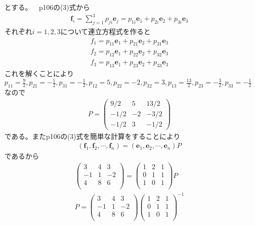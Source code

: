 \documentclass[dvipdfmx,uplatex,11pt]{jsarticle}
\begin{document}
とする。~~p106の(3)式から
\begin{eqnarray*}
\bm{f}_i=\sum^{3}_{j=1}p_{ji}\bm{e}_{j}=p_{1i}\bm{e}_1+p_{2i}\bm{e}_2+p_{3i}\bm{e}_3
\end{eqnarray*}
それぞれ$i=1,2,3$について連立方程式を作ると
\begin{eqnarray*}
f_1=p_{11}\bm{e}_1+p_{21}\bm{e}_2+p_{31}\bm{e}_3 \\
f_2=p_{12}\bm{e}_1+p_{22}\bm{e}_2+p_{32}\bm{e}_3 \\
f_3=p_{13}\bm{e}_1+p_{23}\bm{e}_2+p_{33}\bm{e}_3
\end{eqnarray*}
これを解くことにより$p_{11}=\frac{9}{2},p_{21}=-\frac{1}{2},p_{31}=-\frac{1}{2},p_{12}=5,p_{22}=-2,p_{32}=3,p_{13}=\frac{13}{2},p_{23}=-\frac{3}{2},p_{33}=-\frac{1}{2}$なので
\begin{eqnarray*}
P=
\begin{pmatrix}
9/2 & 5  & 13/2 \\
-1/2 & -2 & -3/2 \\
-1/2 & 3 & -1/2
\end{pmatrix}
\end{eqnarray*}
である。またp106の(3)式を簡単な計算をすることにより
\begin{eqnarray*}
(\bm{f}_1,\bm{f}_2,\cdots ,\bm{f}_n)=(\bm{e}_1,\bm{e}_2,\cdots ,\bm{e}_n)P
\end{eqnarray*}
であるから
\begin{eqnarray*}
\begin{pmatrix}
3 & 4 & 3 \\
-1 & 1 & -2 \\
4 & 8 & 6 \\
\end{pmatrix}
=
\begin{pmatrix}
1 & 2 & 1 \\
0 & 1 & 1 \\
1 & 0 & 1 \\
\end{pmatrix}
P \\ 
%
%
%
P=
\begin{pmatrix}
3 & 4 & 3 \\
-1 & 1 & -2 \\
4 & 8 & 6 \\
\end{pmatrix}
\begin{pmatrix}
1 & 2 & 1 \\
0 & 1 & 1 \\
1 & 0 & 1 \\
\end{pmatrix}
^{-1}
\end{eqnarray*}
\end{document}
